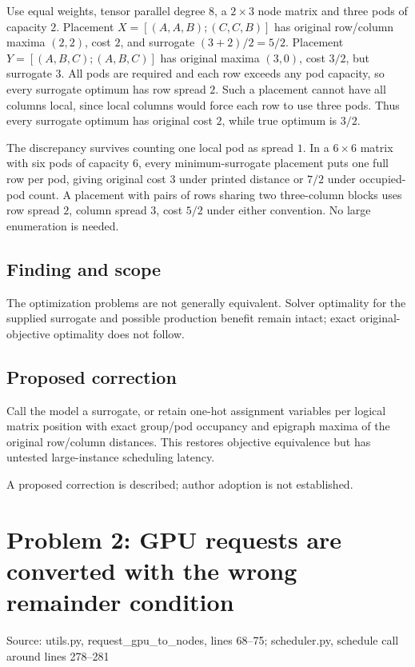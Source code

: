 \documentclass[11pt]{article}
\begin{document}
Use equal weights, tensor parallel degree \(8\), a \(2\times3\) node matrix and three pods of capacity \(2\). Placement \(X=[(A,A,B);(C,C,B)]\) has original row/column maxima \((2,2)\), cost \(2\), and surrogate \((3+2)/2=5/2\). Placement \(Y=[(A,B,C);(A,B,C)]\) has original maxima \((3,0)\), cost \(3/2\), but surrogate \(3\). All pods are required and each row exceeds any pod capacity, so every surrogate optimum has row spread \(2\). Such a placement cannot have all columns local, since local columns would force each row to use three pods. Thus every surrogate optimum has original cost \(2\), while true optimum is \(3/2\).

The discrepancy survives counting one local pod as spread \(1\). In a \(6\times6\) matrix with six pods of capacity \(6\), every minimum-surrogate placement puts one full row per pod, giving original cost \(3\) under printed distance or \(7/2\) under occupied-pod count. A placement with pairs of rows sharing two three-column blocks uses row spread \(2\), column spread \(3\), cost \(5/2\) under either convention. No large enumeration is needed.

\subsection*{Finding and scope}

The optimization problems are not generally equivalent. Solver optimality for the supplied surrogate and possible production benefit remain intact; exact original-objective optimality does not follow.

\subsection*{Proposed correction}

Call the model a surrogate, or retain one-hot assignment variables per logical matrix position with exact group/pod occupancy and epigraph maxima of the original row/column distances. This restores objective equivalence but has untested large-instance scheduling latency.

A proposed correction is described; author adoption is not established.

\section*{Problem 2: GPU requests are converted with the wrong remainder condition}

Source: utils.py, request\_gpu\_to\_nodes, lines 68–75; scheduler.py, schedule call around lines 278–281
\end{document}
